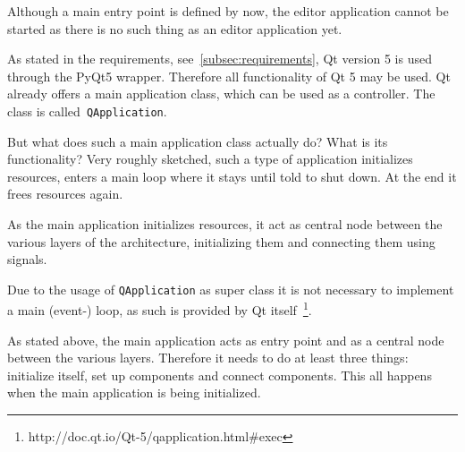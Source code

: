 \documentclass[
    a4paper,      %
    10pt,         %
    openright,    %
    notitlepage,  %
    parskip=half, %
]{scrreprt}       %
\theoremstyle{definition}                    %
\begin{document}
Although a main entry point is defined by now, the editor application cannot be
started as there is no such thing as an editor application yet.


As stated in the requirements, see~\autoref{subsec:requirements}, Qt version 5
is used through the PyQt5 wrapper. Therefore all functionality of Qt 5 may be
used. Qt already offers a main application class, which can be used as a
controller. The class is called~\verb+QApplication+.

But what does such a main application class actually do? What is its
functionality? Very roughly sketched, such a type of application initializes
resources, enters a main loop where it stays until told to shut down. At the end
it frees resources again.

As the main application initializes resources, it act as central node between the
various layers of the architecture, initializing them and connecting them using
signals.\cite[pp. 37 --- 38]{osterwalder_qde_2016}

Due to the usage of \verb+QApplication+ as super class it is not necessary to
implement a main (event-) loop, as such is provided by Qt
itself~\footnote{http://doc.qt.io/Qt-5/qapplication.html\#exec}.

As stated above, the main application acts as entry point and as a central node
between the various layers. Therefore it needs to do at least three things:
initialize itself, set up components and connect components. This all happens
when the main application is being initialized.
\end{document}
